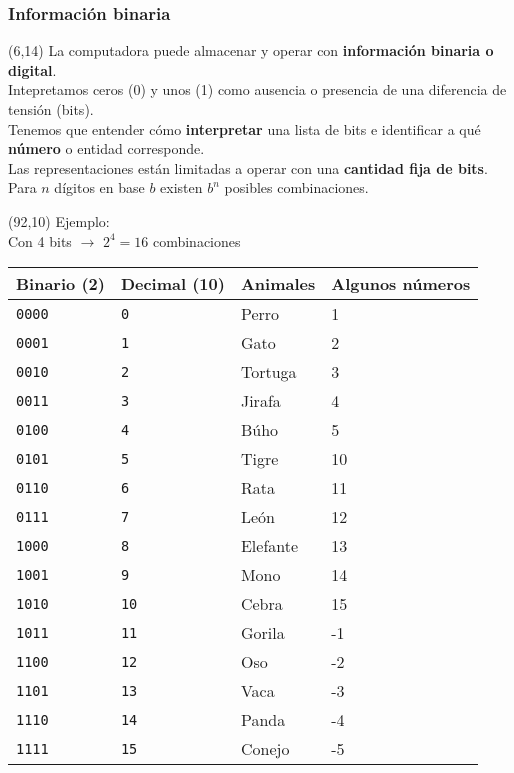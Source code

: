 \documentclass[aspectratio=169]{beamer}
\begin{document}
\begin{frame}[fragile]
    \frametitle{Información binaria}
    \begin{textblock}{78}(6,14)
        La computadora puede almacenar y operar con \textbf{información binaria o digital}.\\
        \bigskip
        Intepretamos ceros (0) y unos (1) como ausencia o presencia de una diferencia de tensión (bits).\\
        \bigskip
        Tenemos que entender cómo \textbf{interpretar} una lista de bits e identificar a qué \textbf{número} o entidad corresponde.\\
        \bigskip
        Las representaciones están limitadas a operar con una \textbf{cantidad fija de bits}.\\
        \bigskip
        Para $n$ dígitos en base $b$ existen $b^n$ posibles combinaciones.
        
    \end{textblock}
    \begin{textblock}{80}(92,10)
        Ejemplo:\\
        \scriptsize Con 4 bits $\rightarrow$ $2^4 = 16$ combinaciones\\
        \bigskip
        \scriptsize
        \begin{tabular}{|p{1cm}|p{1cm}|p{1cm}|p{1cm}|}
        \hline
        Binario (2)    & Decimal (10) & Animales     & Algunos números \\ \hline
        \texttt{0000}  & \texttt{0}   & Perro        & 1\\ 
        \texttt{0001}  & \texttt{1}   & Gato         & 2\\
        \texttt{0010}  & \texttt{2}   & Tortuga      & 3\\ 
        \texttt{0011}  & \texttt{3}   & Jirafa       & 4\\
        \texttt{0100}  & \texttt{4}   & Búho         & 5\\ 
        \texttt{0101}  & \texttt{5}   & Tigre        & 10\\ 
        \texttt{0110}  & \texttt{6}   & Rata         & 11\\ 
        \texttt{0111}  & \texttt{7}   & León         & 12\\
        \texttt{1000}  & \texttt{8}   & Elefante    & 13\\ 
        \texttt{1001}  & \texttt{9}   & Mono         & 14\\ 
        \texttt{1010}  & \texttt{10}  & Cebra        & 15\\ 
        \texttt{1011}  & \texttt{11}  & Gorila       & -1\\ 
        \texttt{1100}  & \texttt{12}  & Oso          & -2\\ 
        \texttt{1101}  & \texttt{13}  & Vaca         & -3\\ 
        \texttt{1110}  & \texttt{14}  & Panda        & -4\\ 
        \texttt{1111}  & \texttt{15}  & Conejo       & -5\\ \hline
        \end{tabular}
    \end{textblock}
\end{frame}
\end{document}
